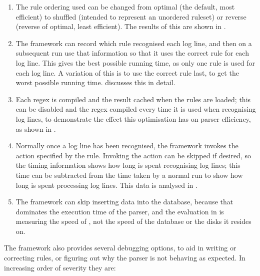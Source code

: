\begin{enumerate}

    \item The rule ordering used can be changed from optimal (the default,
        most efficient) to shuffled (intended to represent an unordered
        ruleset) or reverse (reverse of optimal, least efficient).  The
        results of this are shown in .

    \item The framework can record which rule recognised each log line, and
        then on a subsequent run use that information so that it uses the
        correct rule for each log line.  This gives the best possible
        running time, as only one rule is used for each log line.  A
        variation of this is to use the correct rule last, to get the worst
        possible running time.  
        discusses this in detail.

    \item Each regex is compiled and the result cached when the rules are
        loaded; this can be disabled and the regex compiled every time it
        is used when recognising log lines, to demonstrate the effect this
        optimisation has on parser efficiency, as shown in
        .

    \item Normally once a log line has been recognised, the framework
        invokes the action specified by the rule.  Invoking the action can
        be skipped if desired, so the timing information shows how long is
        spent recognising log lines; this time can be subtracted from the
        time taken by a normal run to show how long is spent processing log
        lines.  This data is analysed in .

    \item The framework can skip inserting data into the database, because
        that dominates the execution time of the parser, and the evaluation
        in  is measuring the speed of \parsername{},
        not the speed of the database or the disks it resides on.

\end{enumerate}

The framework also provides several debugging options, to aid in writing or
correcting rules, or figuring out why the parser is not behaving as
expected.  In increasing order of severity they are:

